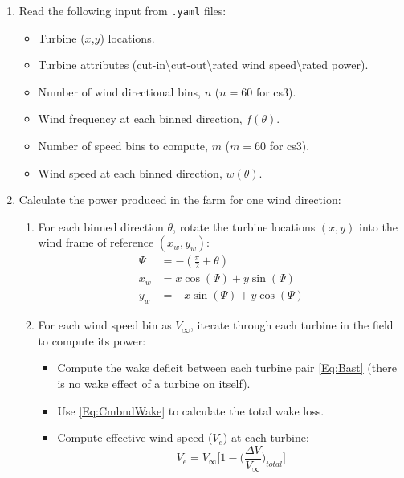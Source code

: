 \documentclass[10pt]{article}
\begin{document}
    \begin{enumerate}
        \item Read the following input from \texttt{.yaml} files:
            \begin{itemize}
                \item Turbine ($x$,$y$) locations.
                \item Turbine attributes (cut-in\textbackslash cut-out\textbackslash rated wind speed\textbackslash rated power).
                \item Number of wind directional bins, $n$ ($n=60$ for cs3).
                \item Wind frequency at each binned direction, $f(\theta)$.
                \item Number of speed bins to compute, $m$ ($m=60$ for cs3).
                \item Wind speed at each binned direction, $w(\theta)$.
            \end{itemize}
        \item Calculate the power produced in the farm for one wind direction:
            \begin{enumerate}
                \item For each binned direction $\theta$, rotate the turbine locations $(x,y)$ into the wind frame of reference $(x_w, y_w)$:
                \begin{align*}
                    \Psi &= -\left(\frac{\pi}{2} + \theta\right) \\
                    x_w &= x\cos(\Psi) + y\sin(\Psi)\\
                    y_w &= -x\sin(\Psi) + y\cos(\Psi)
                \end{align*}
                \item For each wind speed bin as $V_{\infty}$, iterate through each turbine in the field to compute its power:
                    \begin{itemize}
                        \item Compute the wake deficit between each turbine pair \cref{Eq:Bast} (there is no wake effect of a turbine on itself).
                        \item Use \cref{Eq:CmbndWake} to calculate the total wake loss.
                        \item Compute effective wind speed ($V_{e}$) at each turbine:
                            \begin{equation*}
                                V_{e} = V_{\infty} \bigg[1 - \bigg(\frac{\Delta V}{V_{\infty}}\bigg)_{total}\bigg]

\end{equation*}
\end{itemize}
\end{enumerate}
\end{enumerate}
\end{document}
